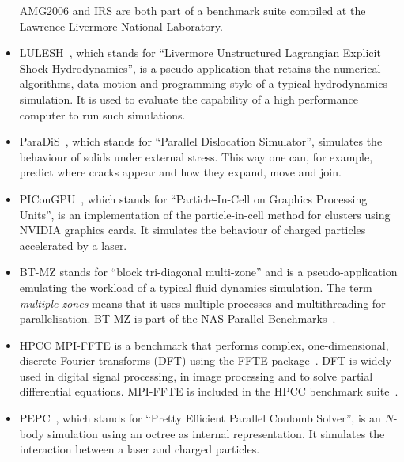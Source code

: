 \documentclass[a4paper, final, diplominf]{zih-template}
\begin{document}
\begin{itemize}
		AMG2006 and IRS are both part of a benchmark suite compiled at the Lawrence Livermore National Laboratory.\vspace{-0.5ex}
	\item LULESH~\cite{karlin13, lulesh}, which stands for ``Livermore Unstructured Lagrangian Explicit Shock Hydrodynamics'', is a pseudo-application that retains the numerical algorithms, data motion and programming style of a typical hydrodynamics simulation.
		It is used to evaluate the capability of a high performance computer to run such simulations.\vspace{-0.5ex}
	\item ParaDiS~\cite{bulatov04, paradis}, which stands for ``Parallel Dislocation Simulator'', simulates the behaviour of solids under external stress.
		This way one can, for example, predict where cracks appear and how they expand, move and join.\vspace{-0.5ex}
	\item PIConGPU~\cite{bussmann13}, which stands for ``Particle-In-Cell on Graphics Processing Units'', is an implementation of the particle-in-cell method for clusters using NVIDIA graphics cards.
		It simulates the behaviour of charged particles accelerated by a laser.\vspace{-0.5ex}
	\item BT-MZ stands for ``block tri-diagonal multi-zone'' and is a pseudo-application emulating the workload of a typical fluid dynamics simulation.
		The term \emph{multiple zones} means that it uses multiple processes and multithreading for parallelisation.
		BT-MZ is part of the NAS Parallel Benchmarks~\cite{bailey91}.\vspace{-0.5ex}
	\item HPCC MPI-FFTE is a benchmark that performs complex, one-dimensional, discrete Fourier transforms (DFT) using the FFTE package~\cite{ffte}.
		DFT is widely used in digital signal processing, in image processing and to solve partial differential equations.
		MPI-FFTE is included in the HPCC benchmark suite~\cite{luszczek06}.\vspace{-0.5ex}
	\item PEPC~\cite{gibbon04}, which stands for ``Pretty Efficient Parallel Coulomb Solver'', is an $N$-body simulation using an octree as internal representation.
		It simulates the interaction between a laser and charged particles.
\end{itemize}
\end{document}
